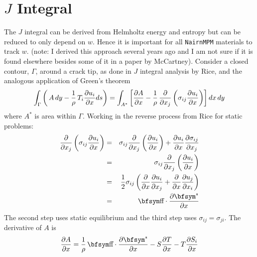 \documentclass[11pt]{book}
\begin{document}
\section{$J$ Integral}

The $J$ integral can be derived from Helmholtz energy and entropy but can be reduced to only depend on $w$. Hence it is important for all {\tt NairnMPM} materials to track $w$. (note: I derived this approach several years ago and I am not sure if it is found elsewhere besides some of it in a paper by McCartney). Consider a closed contour, $\Gamma$, around a crack tip, as done in  $J$ integral analysis by Rice, and the analogous application of Green's theorem
\begin{equation}%
     \int_\Gamma \left(\thinspace A\thinspace dy
                           - {1\over\rho}\thinspace T_i {\partial u_i\over \partial x} ds\right)
     = \int_{A^*} \left[  {\partial A\over \partial x} -{1\over\rho}\thinspace
                 {\partial\over \partial x_j} \left(\sigma_{ij} {\partial u_i\over\partial x}\right)\right]dx\thinspace dy
                   \label{GreensA}
\end{equation}%
where $A^*$ is area within $\Gamma$. Working in the reverse process from Rice for static problems:
\begin{eqnarray}%
       {\partial\over\partial x_j}\left( \sigma_{ij}{\partial u_i\over\partial x}\right)
                 & = &    \sigma_{ij}  {\partial\over\partial x_j}\left({\partial u_i\over\partial x}\right)
                     +  {\partial u_i\over\partial x}{\partial\sigma_{ij}\over\partial x_j}   \\
                 & = & \sigma_{ij}  {\partial\over\partial x_j}\left({\partial u_i\over\partial x}\right) \\
                 & = & {1\over 2} \sigma_{ij}
                       \left({\partial\over\partial x}{\partial u_i\over\partial x_j}
                          + {\partial\over\partial x}{\partial u_j\over\partial x_i}\right) \\
                  & = & \st \cdot {\partial\et\over\partial x}
\end{eqnarray}%
The second step uses static equilibrium and the third step uses $\sigma_{ij}=\sigma_{ji}$. The derivative of $A$ is
\begin{equation}%
    {\partial A\over\partial x}  = {1\over \rho}\thinspace \st\cdot {\partial\et\over\partial x}
                - S {\partial T\over\partial x} - T  {\partial S_i\over\partial x}
\end{equation}%
\end{document}
